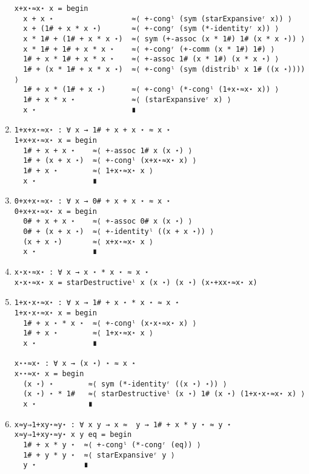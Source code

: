 \begin{enumerate}
\begin{verbatim}
x+x⋆≈x⋆ x = begin
  x + x ⋆                  ≈⟨ +-congˡ (sym (starExpansiveʳ x)) ⟩
  x + (1# + x * x ⋆)       ≈⟨ +-congʳ (sym (*-identityʳ x)) ⟩
  x * 1# + (1# + x * x ⋆)  ≈⟨ sym (+-assoc (x * 1#) 1# (x * x ⋆)) ⟩
  x * 1# + 1# + x * x ⋆    ≈⟨ +-congʳ (+-comm (x * 1#) 1#) ⟩
  1# + x * 1# + x * x ⋆    ≈⟨ +-assoc 1# (x * 1#) (x * x ⋆) ⟩
  1# + (x * 1# + x * x ⋆)  ≈⟨ +-congˡ (sym (distribˡ x 1# ((x ⋆)))) ⟩
  1# + x * (1# + x ⋆)      ≈⟨ +-congˡ (*-congˡ (1+x⋆≈x⋆ x)) ⟩
  1# + x * x ⋆             ≈⟨ (starExpansiveʳ x) ⟩
  x ⋆                      ∎
\end{verbatim}
\item
\begin{verbatim}
1+x+x⋆≈x⋆ : ∀ x → 1# + x + x ⋆ ≈ x ⋆
1+x+x⋆≈x⋆ x = begin
  1# + x + x ⋆    ≈⟨ +-assoc 1# x (x ⋆) ⟩
  1# + (x + x ⋆)  ≈⟨ +-congˡ (x+x⋆≈x⋆ x) ⟩
  1# + x ⋆        ≈⟨ 1+x⋆≈x⋆ x ⟩
  x ⋆             ∎
\end{verbatim}
\item
\begin{verbatim}
0+x+x⋆≈x⋆ : ∀ x → 0# + x + x ⋆ ≈ x ⋆
0+x+x⋆≈x⋆ x = begin
  0# + x + x ⋆    ≈⟨ +-assoc 0# x (x ⋆) ⟩
  0# + (x + x ⋆)  ≈⟨ +-identityˡ ((x + x ⋆)) ⟩
  (x + x ⋆)       ≈⟨ x+x⋆≈x⋆ x ⟩
  x ⋆             ∎
\end{verbatim}
\item
\begin{verbatim}
x⋆x⋆≈x⋆ : ∀ x → x ⋆ * x ⋆ ≈ x ⋆
x⋆x⋆≈x⋆ x = starDestructiveˡ x (x ⋆) (x ⋆) (x⋆+xx⋆≈x⋆ x)
\end{verbatim}
\item
\begin{verbatim}
1+x⋆x⋆≈x⋆ : ∀ x → 1# + x ⋆ * x ⋆ ≈ x ⋆
1+x⋆x⋆≈x⋆ x = begin
  1# + x ⋆ * x ⋆  ≈⟨ +-congˡ (x⋆x⋆≈x⋆ x) ⟩
  1# + x ⋆        ≈⟨ 1+x⋆≈x⋆ x ⟩
  x ⋆             ∎

x⋆⋆≈x⋆ : ∀ x → (x ⋆) ⋆ ≈ x ⋆
x⋆⋆≈x⋆ x = begin
  (x ⋆) ⋆        ≈⟨ sym (*-identityʳ ((x ⋆) ⋆)) ⟩
  (x ⋆) ⋆ * 1#   ≈⟨ starDestructiveˡ (x ⋆) 1# (x ⋆) (1+x⋆x⋆≈x⋆ x) ⟩
  x ⋆            ∎
\end{verbatim}
\item
\begin{verbatim}
x≈y⇒1+xy⋆≈y⋆ : ∀ x y → x ≈  y → 1# + x * y ⋆ ≈ y ⋆
x≈y⇒1+xy⋆≈y⋆ x y eq = begin
  1# + x * y ⋆  ≈⟨ +-congˡ (*-congʳ (eq)) ⟩
  1# + y * y ⋆  ≈⟨ starExpansiveʳ y ⟩
  y ⋆           ∎


\end{verbatim}
\end{enumerate}
